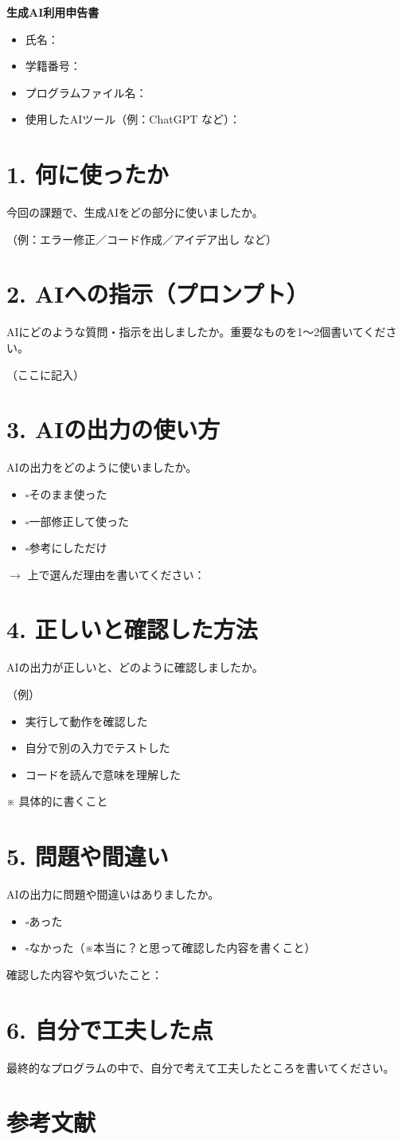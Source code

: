 \documentclass[a4paper,11pt,dvipdfmx]{jsarticle}
\newcommand{\cboxoff}{$\square$}
\begin{document}
{\LARGE\bfseries 生成AI利用申告書}
\vspace{1em}

\begin{itemize}
  \item 氏名：
  \item 学籍番号：
  \item プログラムファイル名：
  \item 使用したAIツール（例：ChatGPT など）：
\end{itemize}

\section*{1. 何に使ったか}
今回の課題で、生成AIをどの部分に使いましたか。

（例：エラー修正／コード作成／アイデア出し など）

\section*{2. AIへの指示（プロンプト）}
AIにどのような質問・指示を出しましたか。重要なものを1〜2個書いてください。

（ここに記入）

\section*{3. AIの出力の使い方}
AIの出力をどのように使いましたか。
\begin{itemize}
  \item \cboxoff そのまま使った
  \item \cboxoff 一部修正して使った
  \item \cboxoff 参考にしただけ
\end{itemize}
$\rightarrow$ 上で選んだ理由を書いてください：

\section*{4. 正しいと確認した方法}
AIの出力が正しいと、どのように確認しましたか。

（例）
\begin{itemize}
  \item 実行して動作を確認した
  \item 自分で別の入力でテストした
  \item コードを読んで意味を理解した
\end{itemize}
※ 具体的に書くこと

\section*{5. 問題や間違い}
AIの出力に問題や間違いはありましたか。
\begin{itemize}
  \item \cboxoff あった
  \item \cboxoff なかった（※本当に？と思って確認した内容を書くこと）
\end{itemize}
確認した内容や気づいたこと：

\section*{6. 自分で工夫した点}
最終的なプログラムの中で、自分で考えて工夫したところを書いてください。

\section*{参考文献}
\end{document}

